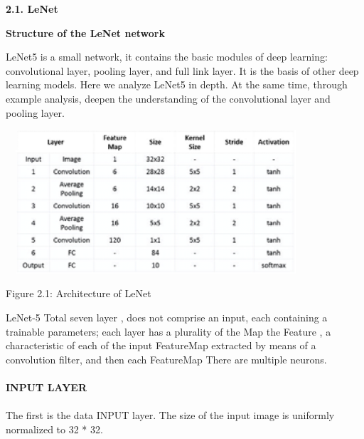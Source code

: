 \documentclass[10pt]{article} %
\begin{document}
\noindent \textbf{}

\noindent \textbf{2.1. LeNet}
\vspace{5mm}
\begin{spacing}{1.5}
\noindent \textbf{Structure of the LeNet network}

\noindent LeNet5 is a small network, it contains the basic modules of deep learning: convolutional layer, pooling layer, and full link layer. It is the basis of other deep learning models. Here we analyze LeNet5 in depth. At the same time, through example analysis, deepen the understanding of the convolutional layer and pooling layer.

\vspace{5mm}

\noindent 
\noindent \includegraphics*[width=4.4in, height=2.1in, keepaspectratio=false]{image5}

\vspace{2mm} 
\noindent Figure 2.1: Architecture of LeNet

\vspace{2mm} 

\noindent LeNet-5 Total seven layer , does not comprise an input, each containing a trainable parameters; each layer has a plurality of the Map the Feature , a characteristic of each of the input FeatureMap extracted by means of a convolution filter, and then each FeatureMap There are multiple neurons.
\paragraph{}
\vspace{3mm}

\vspace{2mm}
\paragraph{}
\textbf{INPUT LAYER}
\paragraph{}
\justifying
The first is the data INPUT layer. The size of the input image is uniformly normalized to 32 * 32.

\end{spacing}
\end{document}

